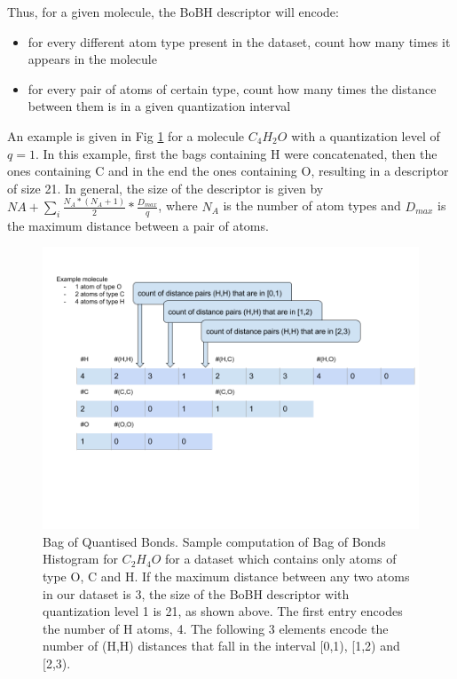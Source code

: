 \documentclass[10pt,journal,a4paper]{IEEEtran}
\begin{document}
Thus, for a given molecule, the BoBH descriptor will encode:
\begin{itemize}
\item 
for every different atom type present in the dataset, count how many times it appears in the molecule
\item  
for every pair of atoms of certain type, count how many times the distance between them is in a given quantization interval 
\end{itemize}

An example is given in Fig \ref{fig:BoBH} for a molecule $C_{4}H_{2}O$ with a quantization level of $q=1$. In this example, first the bags containing H were concatenated, then the ones containing C and in the end the ones containing O, resulting in a descriptor of size 21. In general, the size of the descriptor is given by $NA + \sum_i \frac{N_A*(N_A+1)}{2} *\frac{D_{max}}{q} $, where $N_A$ is the number of atom types and $D_{max}$ is the maximum distance between a pair of atoms. 

\begin{figure}[h!]

\includegraphics[scale=0.25]{HistogramOfDistances.png}
\caption{Bag of Quantised Bonds.
Sample computation of Bag of Bonds Histogram for $C_2H_4O$ for a dataset which contains only atoms of type O, C and H. If the maximum distance between any two atoms in our dataset is 3, the size of the BoBH descriptor with quantization level  1 is 21, as shown above. The first entry encodes the number of H atoms, 4. The following 3 elements encode the number of (H,H) distances that fall in the interval [0,1), [1,2) and [2,3).
}
\label{fig:BoBH}
\end{figure}
\end{document}
